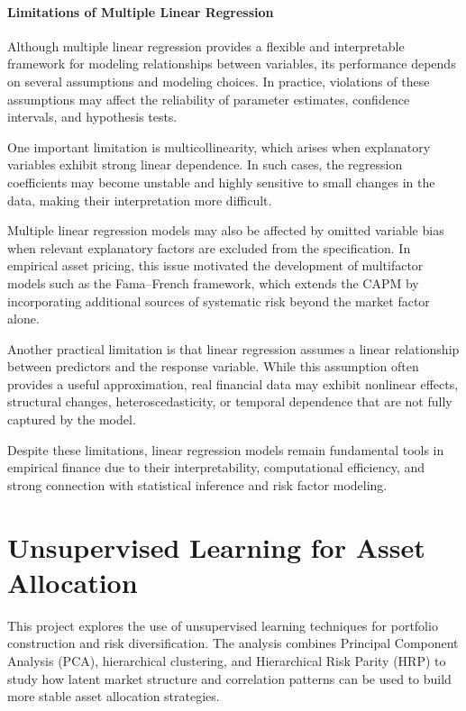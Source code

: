 \documentclass[
  12pt,
  letterpaper,
]{book}
\begin{document}
\subsubsection{Limitations of Multiple Linear
Regression}\label{limitations-of-multiple-linear-regression}

Although multiple linear regression provides a flexible and
interpretable framework for modeling relationships between variables,
its performance depends on several assumptions and modeling choices. In
practice, violations of these assumptions may affect the reliability of
parameter estimates, confidence intervals, and hypothesis tests.

One important limitation is multicollinearity, which arises when
explanatory variables exhibit strong linear dependence. In such cases,
the regression coefficients may become unstable and highly sensitive to
small changes in the data, making their interpretation more difficult.

Multiple linear regression models may also be affected by omitted
variable bias when relevant explanatory factors are excluded from the
specification. In empirical asset pricing, this issue motivated the
development of multifactor models such as the Fama--French framework,
which extends the CAPM by incorporating additional sources of systematic
risk beyond the market factor alone.

Another practical limitation is that linear regression assumes a linear
relationship between predictors and the response variable. While this
assumption often provides a useful approximation, real financial data
may exhibit nonlinear effects, structural changes, heteroscedasticity,
or temporal dependence that are not fully captured by the model.

Despite these limitations, linear regression models remain fundamental
tools in empirical finance due to their interpretability, computational
efficiency, and strong connection with statistical inference and risk
factor modeling.

\chapter{Unsupervised Learning for Asset
Allocation}\label{unsupervised-learning-for-asset-allocation}

This project explores the use of unsupervised learning techniques for
portfolio construction and risk diversification. The analysis combines
Principal Component Analysis (PCA), hierarchical clustering, and
Hierarchical Risk Parity (HRP) to study how latent market structure and
correlation patterns can be used to build more stable asset allocation
strategies.
\end{document}
